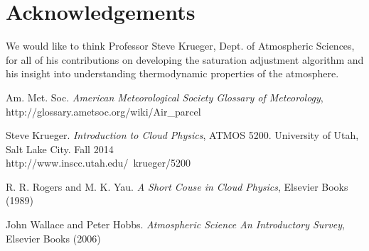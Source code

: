 \documentclass{article}
\begin{document}
\section{Acknowledgements}
We would like to think Professor Steve Krueger, Dept. of Atmospheric Sciences, for all of his contributions on developing the saturation adjustment algorithm and his insight into understanding thermodynamic properties of the atmosphere.

\newpage
\begin{thebibliography}{4}

Am. Met. Soc.
\emph{American Meteorological Society Glossary of Meteorology},\\
http://glossary.ametsoc.org/wiki/Air\_parcel

Steve Krueger.
\emph{Introduction to Cloud Physics},
ATMOS 5200. University of Utah, Salt Lake City. Fall 2014 \\
http://www.inscc.utah.edu/~krueger/5200

R. R. Rogers and M. K. Yau.
\emph{A Short Couse in Cloud Physics},
Elsevier Books (1989)

John Wallace and Peter Hobbs.
\emph{Atmospheric Science An Introductory Survey},
Elsevier Books (2006)



\end{thebibliography}
\end{document}
